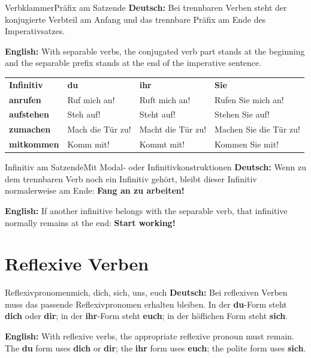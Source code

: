 \documentclass[a4paper,11pt]{article}
\newcommand{\GermanText}[1]{\textbf{Deutsch: }#1\par}
\newcommand{\EnglishText}[1]{{\small\color{SoftGray}\textbf{English: }#1\par}}
\begin{document}
        \begin{grammarentry}{Verbklammer}{Präfix am Satzende}
            \GermanText{Bei trennbaren Verben steht der konjugierte Verbteil am Anfang und das trennbare Präfix am Ende des Imperativsatzes.}
            \EnglishText{With separable verbs, the conjugated verb part stands at the beginning and the separable prefix stands at the end of the imperative sentence.}
        \end{grammarentry}

        \begin{longtable}{>{\bfseries}p{3cm}|p{3.5cm}|p{3.7cm}|p{4.3cm}}
            \rowcolor{HeaderBlueDark}
            \color{white}\textbf{Infinitiv} &
            \color{white}\textbf{du} &
            \color{white}\textbf{ihr} &
            \color{white}\textbf{Sie} \\
            anrufen & Ruf mich an! & Ruft mich an! & Rufen Sie mich an! \\
            aufstehen & Steh auf! & Steht auf! & Stehen Sie auf! \\
            zumachen & Mach die Tür zu! & Macht die Tür zu! & Machen Sie die Tür zu! \\
            mitkommen & Komm mit! & Kommt mit! & Kommen Sie mit! \\
        \end{longtable}

        \begin{grammarentry}{Infinitiv am Satzende}{Mit Modal- oder Infinitivkonstruktionen}
            \GermanText{Wenn zu dem trennbaren Verb noch ein Infinitiv gehört, bleibt dieser Infinitiv normalerweise am Ende: \textbf{Fang an zu arbeiten!}}
            \EnglishText{If another infinitive belongs with the separable verb, that infinitive normally remains at the end: \textbf{Start working!}}
        \end{grammarentry}

    \section{Reflexive Verben}

        \begin{grammarentry}{Reflexivpronomen}{mich, dich, sich, uns, euch}
            \GermanText{Bei reflexiven Verben muss das passende Reflexivpronomen erhalten bleiben. In der \textbf{du}-Form steht \textbf{dich} oder \textbf{dir}; in der \textbf{ihr}-Form steht \textbf{euch}; in der höflichen Form steht \textbf{sich}.}
            \EnglishText{With reflexive verbs, the appropriate reflexive pronoun must remain. The \textbf{du} form uses \textbf{dich} or \textbf{dir}; the \textbf{ihr} form uses \textbf{euch}; the polite form uses \textbf{sich}.}
        \end{grammarentry}
\end{document}
